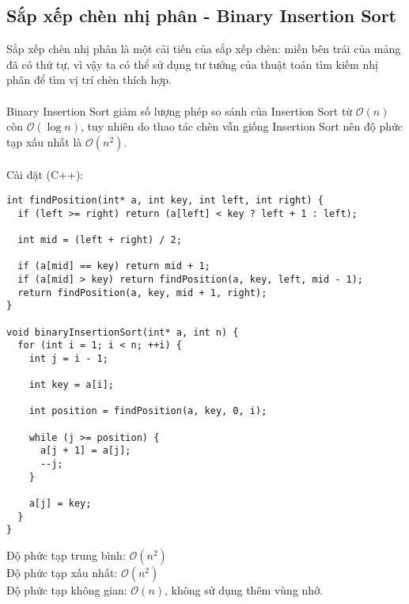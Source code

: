 \documentclass[]{article}
\begin{document}
\subsection{Sắp xếp chèn nhị phân - Binary Insertion Sort}
Sắp xếp chèn nhị phân là một cải tiến của sắp xếp chèn: miền bên trái của mảng đã có thứ tự, vì vậy ta có thể sử dụng tư tưởng của thuật toán tìm kiếm nhị phân để tìm vị trí chèn thích hợp.
\\\\
Binary Insertion Sort giảm số lượng phép so sánh của Insertion Sort từ $\mathcal{O}(n)$ còn $\mathcal{O}(\log n)$, tuy nhiên do thao tác chèn vẫn giống Insertion Sort nên độ phức tạp xấu nhất là $\mathcal{O}(n^2)$.
\\\\
Cài đặt (C++):
\begin{lstlisting}
int findPosition(int* a, int key, int left, int right) {
  if (left >= right) return (a[left] < key ? left + 1 : left);

  int mid = (left + right) / 2;

  if (a[mid] == key) return mid + 1;
  if (a[mid] > key) return findPosition(a, key, left, mid - 1);
  return findPosition(a, key, mid + 1, right);
}

void binaryInsertionSort(int* a, int n) {
  for (int i = 1; i < n; ++i) {
    int j = i - 1;

    int key = a[i];

    int position = findPosition(a, key, 0, i);

    while (j >= position) {
      a[j + 1] = a[j];
      --j;
    }

    a[j] = key;
  }
}
\end{lstlisting}
Độ phức tạp trung bình: $\mathcal{O}(n^2)$
\\
Độ phức tạp xấu nhất: $\mathcal{O}(n^2)$
\\
Độ phức tạp không gian: $\mathcal{O}(n)$, không sử dụng thêm vùng nhớ.
\end{document}
